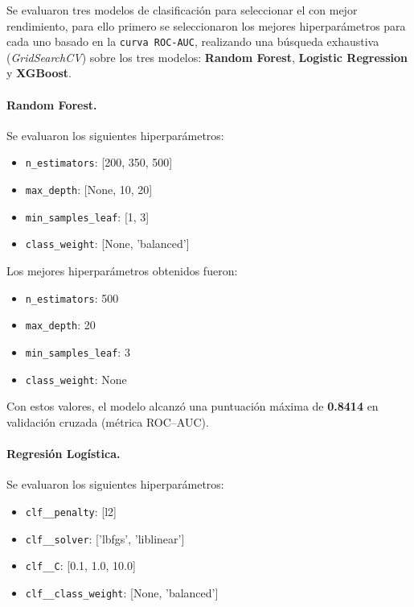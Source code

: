 \documentclass[12pt]{article}
\begin{document}
Se evaluaron tres modelos de clasificación para seleccionar el con mejor rendimiento, para ello primero se seleccionaron los mejores hiperparámetros para cada uno basado en la \texttt{curva ROC-AUC}, realizando una búsqueda exhaustiva (\textit{GridSearchCV}) sobre los tres modelos: \textbf{Random Forest}, \textbf{Logistic Regression} y \textbf{XGBoost}.

\paragraph{Random Forest.}
Se evaluaron los siguientes hiperparámetros:

\begin{itemize}
    \item \texttt{n\_estimators}: [200, 350, 500]
    \item \texttt{max\_depth}: [None, 10, 20]
    \item \texttt{min\_samples\_leaf}: [1, 3]
    \item \texttt{class\_weight}: [None, 'balanced']
\end{itemize}

Los mejores hiperparámetros obtenidos fueron:

\begin{itemize}
    \item \texttt{n\_estimators}: 500
    \item \texttt{max\_depth}: 20
    \item \texttt{min\_samples\_leaf}: 3
    \item \texttt{class\_weight}: None
\end{itemize}

Con estos valores, el modelo alcanzó una puntuación máxima de \textbf{0.8414} en validación cruzada (métrica ROC–AUC).

\paragraph{Regresión Logística.}
Se evaluaron los siguientes hiperparámetros:

\begin{itemize}
    \item \texttt{clf\_\_penalty}: [l2]
    \item \texttt{clf\_\_solver}: ['lbfgs', 'liblinear']
    \item \texttt{clf\_\_C}: [0.1, 1.0, 10.0]
    \item \texttt{clf\_\_class\_weight}: [None, 'balanced']
\end{itemize}
\end{document}
